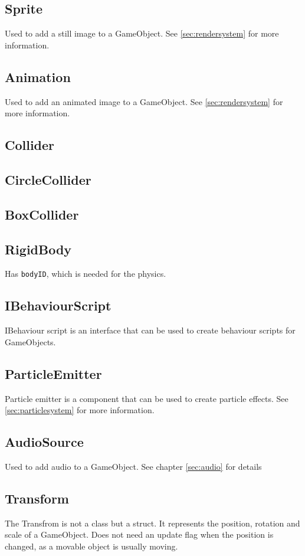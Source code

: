 \subsection{Sprite}
Used to add a still image to a GameObject.
See \autoref{sec:rendersystem} for more information.

\subsection{Animation}
Used to add an animated image to a GameObject.
See \autoref{sec:rendersystem} for more information.

\subsection{Collider}

\subsection{CircleCollider}

\subsection{BoxCollider}

\subsection{RigidBody}
Has \texttt{bodyID}, which is needed for the physics.

\subsection{IBehaviourScript}
IBehaviour script is an interface that can be used to create behaviour scripts for GameObjects.

\subsection{ParticleEmitter}
Particle emitter is a component that can be used to create particle effects.
See \autoref{sec:particlesystem} for more information.

\subsection{AudioSource}
Used to add audio to a GameObject. See chapter \autoref{sec:audio} for details

\subsection{Transform}
The Transfrom is not a class but a struct. It represents the position, rotation and scale of a GameObject.
Does not need an update flag when the position is changed, as a movable object is usually moving.


